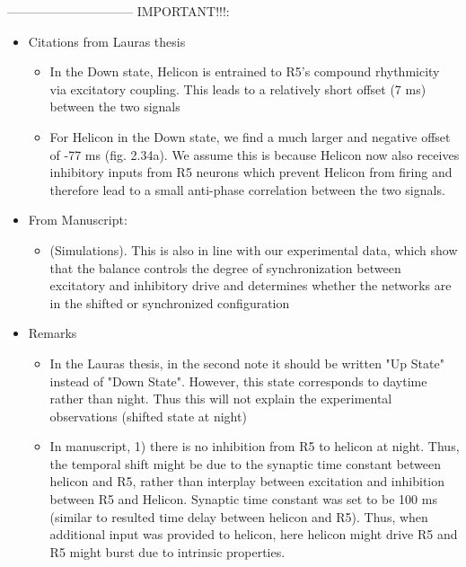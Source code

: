 \documentclass[../main.tex]{subfiles}
\begin{document}
------------------------------
IMPORTANT!!!:
\begin{itemize}
    \item Citations from Lauras thesis
    \begin{itemize}
        \item In the Down state, Helicon is entrained to R5's compound rhythmicity via excitatory
        coupling. This leads to a relatively short offset (7 ms) between the two signals
        \item For Helicon in the Down state, we find a much larger and negative offset of 
        -77 ms (fig. 2.34a). We assume this is because Helicon now also receives inhibitory inputs
        from R5 neurons which prevent Helicon from firing and therefore lead to a small anti-phase
        correlation between the two signals.
    \end{itemize}
    \item From Manuscript:
    \begin{itemize}
        \item (Simulations). This is also in line with our experimental data, which show
        that the balance controls the degree of synchronization between excitatory and inhibitory
        drive and determines whether the networks are in the shifted or synchronized configuration
    \end{itemize}
    \item Remarks
    \begin{itemize}
        \item In the Lauras thesis, in the second note it should be written "Up State" instead of
        "Down State". However, this state
        corresponds to daytime rather than night. Thus this will not explain the experimental
        observations (shifted state at night)
        \item In manuscript, 1) there is no inhibition from R5 to helicon at night. Thus,
        the temporal shift might be due to the synaptic time constant between helicon and R5,
        rather than interplay between excitation and inhibition between R5 and Helicon.
        Synaptic time constant was set to be 100 ms (similar to resulted time delay between helicon and R5).
        Thus, when additional input was provided to helicon, here helicon might drive R5 and R5 might burst due to intrinsic properties.
    \end{itemize}
\end{itemize}

\color{black}
\end{document}
